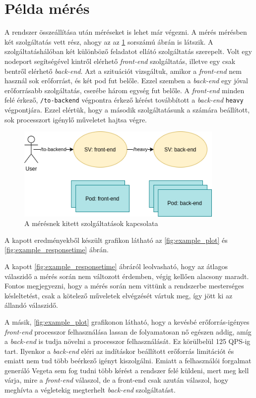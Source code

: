 \section{Példa mérés}
A rendszer összeállítása után méréseket is lehet már végezni. A mérés mérésben két szolgáltatás vett rész, ahogy az az \ref{fig:sample_sg} sorszámú ábrán is látszik. A szolgáltatáshálóban két különböző feladatot ellátó szolgáltatás szerepelt. Volt egy nodeport segítségével kintről elérhető \textit{front-end} szolgáltatás, illetve egy csak bentről elérhető \textit{back-end}. Azt a szituációt vizsgáltuk, amikor a \textit{front-end} nem használ sok erőforrást, és két pod fut belőle. Ezzel szemben a \textit{back-end} egy jóval erőforrásabb szolgáltatás, cserébe három egység fut belőle. A \textit{front-end} minden felé érkező, \verb+/to-backend+ végpontra érkező kérést továbbított a \textit{back-end} \verb+heavy+ végpontjára. Ezzel elértük, hogy a második szolgáltatásunk a számára beállított, sok processzort igénylő műveletet hajtsa végre.


\begin{figure}[!ht]
\centering
\includegraphics[width=100mm, keepaspectratio]{figures/sample_measurement.png}
\caption{A mérésnek kitett szolgáltatások kapcsolata}
\label{fig:sample_sg}
\end{figure}

A kapott eredményekből készült grafikon látható az \ref{fig:example_plot} és \ref{fig:example_responsetime} ábrán. 

A kapott \ref{fig:example_responsetime} ábráról leolvasható, hogy az átlagos válaszidő a mérés során nem változott érdemben, végig kellően alacsony maradt. Fontos megjegyezni, hogy a mérés során nem vittünk a rendszerbe mesterséges késleltetést, csak a kötelező műveletek elvégzését vártuk meg, így jött ki az állandó válaszidő.

A másik, \ref{fig:example_plot} grafikonon látható, hogy a kevésbé erőforrás-igényes \textit{front-end} processzor felhasználása lassan de folyamatosan nő egészen addig, amíg a \textit{back-end} is tudja növelni a processzor felhasználását. Ez körülbelül 125 QPS-ig tart. Ilyenkor a \textit{back-end} eléri az indításkor beállított erőforrás limitációt és emiatt nem tud több beérkező igényt kiszolgálni.  Emiatt a felhasználói forgalmat generáló Vegeta sem fog tudni több kérést a rendszer felé küldeni, mert meg kell várja, mire a \textit{front-end} válaszol, de a front-end csak azután válaszol, hogy meghívta a végletekig megterhelt \textit{back-end} szolgáltatást.

